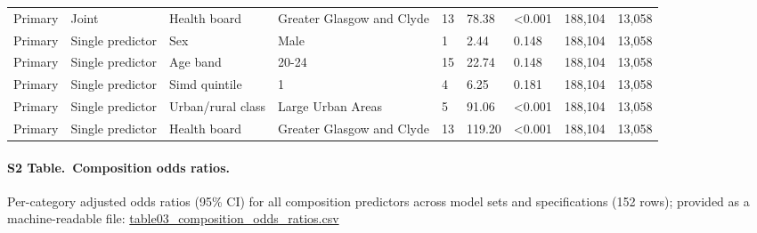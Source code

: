 \documentclass[10pt,letterpaper]{article}
\begin{document}
\begin{center}
{\begin{tabular}{lllllllll}
Primary & Joint & Health board & Greater Glasgow and Clyde & 13 & 78.38 & \textless{}0.001 & 188,104 & 13,058 \\
Primary & Single predictor & Sex & Male & 1 & 2.44 & 0.148 & 188,104 & 13,058 \\
Primary & Single predictor & Age band & 20-24 & 15 & 22.74 & 0.148 & 188,104 & 13,058 \\
Primary & Single predictor & Simd quintile & 1 & 4 & 6.25 & 0.181 & 188,104 & 13,058 \\
Primary & Single predictor & Urban/rural class & Large Urban Areas & 5 & 91.06 & \textless{}0.001 & 188,104 & 13,058 \\
Primary & Single predictor & Health board & Greater Glasgow and Clyde & 13 & 119.20 & \textless{}0.001 & 188,104 & 13,058 \\
\bottomrule
\end{tabular}}\end{center}
\vspace{1.5em}

\paragraph*{S2 Table.\ Composition odds ratios.} Per-category adjusted odds ratios (95\% CI) for all composition predictors across model sets and specifications (152 rows); provided as a machine-readable file: \url{table03_composition_odds_ratios.csv}
\vspace{1em}
\end{document}
